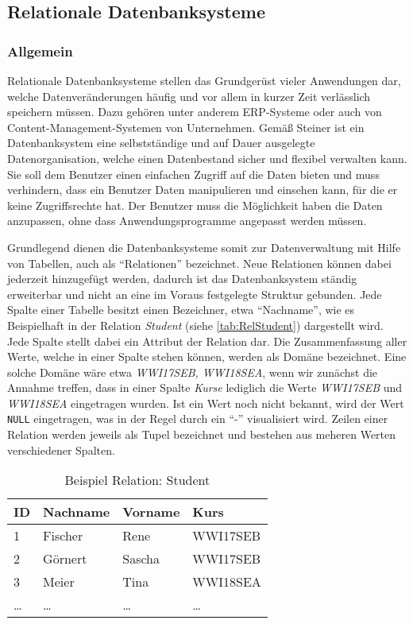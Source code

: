 \subsection{Relationale Datenbanksysteme}

\subsubsection{Allgemein}

Relationale Datenbanksysteme stellen das Grundgerüst vieler Anwendungen dar, welche Datenveränderungen häufig und vor allem in kurzer Zeit verlässlich speichern müssen.
Dazu gehören unter anderem \ac{ERP}-Systeme oder auch von Content-Management-Systemen von Unternehmen.
Gemäß Steiner ist ein Datenbanksystem eine selbstständige und auf Dauer ausgelegte Datenorganisation, welche einen Datenbestand sicher und flexibel verwalten kann.
Sie soll dem Benutzer einen einfachen Zugriff auf die Daten bieten und muss verhindern, dass ein Benutzer Daten manipulieren und einsehen kann, für die er keine Zugriffsrechte hat.
Der Benutzer muss die Möglichkeit haben die Daten anzupassen, ohne dass Anwendungsprogramme angepasst werden müssen.\autocite[Vgl.][S.5 f.]{Book_DB_2}

Grundlegend dienen die Datenbanksysteme somit zur Datenverwaltung mit Hilfe von Tabellen, auch als \enquote{Relationen} bezeichnet.
Neue Relationen können dabei jederzeit hinzugefügt werden, dadurch ist das Datenbanksystem ständig erweiterbar und nicht an eine im Voraus festgelegte Struktur gebunden.
Jede Spalte einer Tabelle besitzt einen Bezeichner, etwa \enquote{Nachname}, wie es Beispielhaft in der Relation \emph{Student} (siehe \vref{tab:RelStudent}) dargestellt wird.
Jede Spalte stellt dabei ein Attribut der Relation dar.
Die Zusammenfassung aller Werte, welche in einer Spalte stehen können, werden als Domäne bezeichnet.
Eine solche Domäne wäre etwa \emph{WWI17SEB, WWI18SEA}, wenn wir zunächst die Annahme treffen, dass in einer Spalte \emph{Kurse} lediglich die Werte \emph{WWI17SEB} und \emph{WWI18SEA} eingetragen wurden.
Ist ein Wert noch nicht bekannt, wird der Wert \texttt{NULL} eingetragen, was in der Regel durch ein \enquote{-} visualisiert wird.
Zeilen einer Relation werden jeweils als Tupel bezeichnet und bestehen aus meheren Werten verschiedener Spalten.\autocite[vgl. S.9 ff.][]{Book_DB_2}

\begin{table}
    \centering
    \begin{tabular}[h]{l | l | l | l}
        ID & Nachname & Vorname & Kurs \\ \hline
        1 & Fischer & Rene & WWI17SEB \\
        2 & Görnert & Sascha & WWI17SEB \\
        3 & Meier & Tina & WWI18SEA \\
        \dots & \dots & \dots & \dots \\
        \end{tabular}
        \caption{Beispiel Relation: Student}
        \label{tab:RelStudent}
\end{table}


